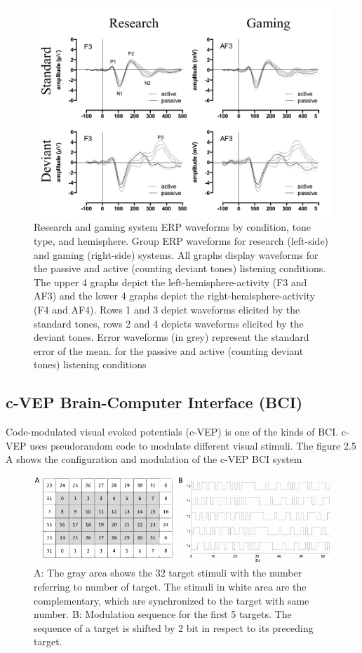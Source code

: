 \begin{figure}[ht]
	\centering
  	\includegraphics[scale = 0.75]{chapter2/24.pdf}
  	\caption{Research and gaming system ERP waveforms by condition, tone type, and hemisphere. Group ERP waveforms for research (left-side) and gaming (right-side) systems. All graphs display waveforms for the passive and active (counting deviant tones) listening conditions. The upper 4 graphs depict the left-hemisphere-activity (F3 and AF3) and the lower 4 graphs depict the right-hemisphere-activity (F4 and AF4). Rows 1 and 3 depict waveforms elicited by the standard tones, rows 2 and 4 depicts waveforms elicited by the deviant tones. Error waveforms (in grey) represent the standard error of the mean. for the passive and active (counting deviant tones) listening conditions}
\end{figure}
\newpage

\subsection {c-VEP Brain-Computer Interface (BCI)\cite{ref5}}

\hspace{1.5cm} Code-modulated visual evoked potentials (c-VEP) is one of the kinds of BCI. c-VEP uses pseudorandom code to modulate different visual stimuli. The figure 2.5 A shows the configuration and modulation of the c-VEP BCI system

\begin{figure}[ht]
	\centering
  	\includegraphics[scale = 1]{chapter2/25.pdf}
  	\caption{A: The gray area shows the 32 target stimuli with the number referring to number of  target. The stimuli in white area are the complementary, which are synchronized to the target with same number. B: Modulation sequence for the first 5 targets. The sequence of a target is shifted by 2 bit in respect to its preceding target.}
\end{figure}

